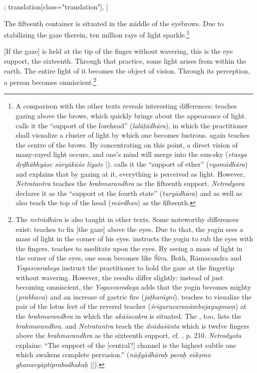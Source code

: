 \begin{alignment}[
  texts=edition[class="edition"];
  translation[class="translation"],
  ]
\begin{translation}
\begin{tlate}
      The fifteenth container is situated in the middle of the eyebrows. Due to stabilizing the gaze therein, ten million rays of light sparkle.\footnote{A comparison with the other texts reveals interesting differences:  teaches gazing above the brows, which quickly brings about the appearance of light.  calls it the ``support of the forehead'' (\textit{lalāṭādhāra}), in which the practitioner shall visualize a cluster of light by which one becomes lustrous.  again teaches the centre of the brows. By concentrating on this point, a direct vision of many-rayed light occurs, and one's mind will merge into the sun-sky (\textit{etasya dṛḍhābhyāse sūryākāśo līyate} |).  calls it the ``support of ether'' (\textit{vyomādhāra}) and explains that by gazing at it, everything is perceived as light. However, \textit{Netratantra} teaches the \textit{brahmarandhra} as the fifteenth support. \textit{Netrodyora} declares it as the ``support ot the fourth state'' (\textit{turyādhāra}) and  as well as  also teach the top of the head (\textit{mūrdhan}) as the fifteenth.}
      
      [If the gaze] is held at the tip of the finger without wavering, this is the eye support, the sixteenth. Through that practice, some light arises from within the earth. The entire light of it becomes the object of vision. Through its perception, a person becomes omniscient.\footnote{The \textit{netrādhāra} is also taught in other texts. Some noteworthy differences exist:  teaches to fix [the gaze] above the eyes. Due to that, the yogin sees a mass of light in the corner of his eyes.  instructs the yogin to rub the eyes with the fingers.  teaches to meditate upon the eyes. By seeing a mass of light in the corner of the eyes, one soon becomes like Śiva. Both, Rāmacandra and \textit{Yogasvarodaya} instruct the practitioner to hold the gaze at the fingertip without wavering. However, the results differ slightly: instead of just becoming omniscient, the \textit{Yogasvarodaya} adds that the yogin becomes mighty (\textit{prabhava}) and an increase of gastric fire (\textit{jaṭharāgni}).  teaches to visualize the pair of the lotus feet of the revered teacher (\textit{śrīgurucaraṇāmbujayugmaṃ}) at the \textit{brahmarandhra} in which the \textit{akāśacakra} is situated. The , too, lists the \textit{brahmarandhra}.  and \textit{Netratantra} teach the \textit{dvādaśānta} which is twelve fingers above the \textit{brahmarandhra} as the sixteenth support, cf. , p. 210. \textit{Netrodyota} explains: ``The support of the [central?] channel is the highest subtle one which awakens complete pervasion.'' (\textit{nāḍyādhāraḥ paraḥ sūkṣmo ghanavyāptiprabodhakaḥ} ||).}
      \clearpage
    \end{tlate}
  \end{translation}
\end{alignment}

